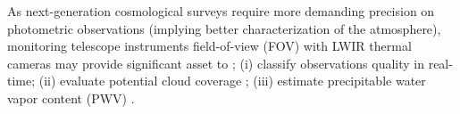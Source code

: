 \documentclass[amt, article]{copernicus}
\begin{document}
As next-generation cosmological surveys require more demanding precision on photometric observations (implying better characterization of the atmosphere), monitoring telescope instruments field-of-view (FOV) with LWIR thermal cameras may provide significant asset to ; (i) classify observations quality in real-time; (ii) evaluate potential cloud coverage \citep{Smith2008, liandrat2017cloud, amt-11-5549-2018, rs13091852}; (iii) estimate precipitable water vapor content (PWV) \citep{amt-15-1563-2022, Hack2023, environsciproc2023026033}.
\end{document}

